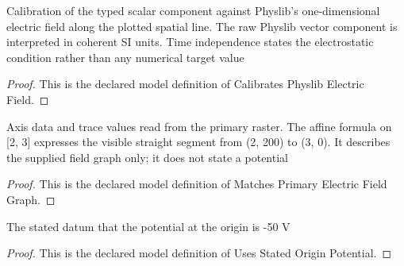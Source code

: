 \begin{definition}
  \label{def:physics:phyx-mini-0869:phyxminiproblems-problemphyxmini0869-calibratesphyslibelectricfield}
  Calibration of the typed scalar component against Physlib's one-dimensional electric field along the plotted spatial line. The raw Physlib vector component is interpreted in coherent SI units. Time independence states the electrostatic condition rather than any numerical target value
\end{definition}
\begin{proof}
  This is the declared model definition of Calibrates Physlib Electric Field.
\end{proof}
\begin{definition}
  \label{def:physics:phyx-mini-0869:phyxminiproblems-problemphyxmini0869-matchesprimaryelectricfieldgraph}
  Axis data and trace values read from the primary raster. The affine formula on [2, 3] expresses the visible straight segment from (2, 200) to (3, 0). It describes the supplied field graph only; it does not state a potential
\end{definition}
\begin{proof}
  This is the declared model definition of Matches Primary Electric Field Graph.
\end{proof}
\begin{definition}
  \label{def:physics:phyx-mini-0869:phyxminiproblems-problemphyxmini0869-usesstatedoriginpotential}
  The stated datum that the potential at the origin is -50 V
\end{definition}
\begin{proof}
  This is the declared model definition of Uses Stated Origin Potential.
\end{proof}
